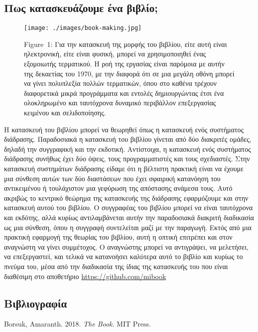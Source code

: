 \documentclass[
]{article}
\newlength{\cslhangindent}
\newlength{\cslentryspacingunit} %
\newenvironment{CSLReferences}[2] %
 {%
  \setlength{\parindent}{0pt}
  \ifodd #1
  \let\oldpar\par
  \def\par{\hangindent=\cslhangindent\oldpar}
  \fi
  \setlength{\parskip}{#2\cslentryspacingunit}
 }%
 {}
\begin{document}
\hypertarget{ux3c0ux3c9ux3c2-ux3baux3b1ux3c4ux3b1ux3c3ux3baux3b5ux3c5ux3acux3b6ux3bfux3c5ux3bcux3b5-ux3adux3bdux3b1-ux3b2ux3b9ux3b2ux3bbux3afux3bf}{%
\subsection{Πως κατασκευάζουμε ένα
βιβλίο;}\label{ux3c0ux3c9ux3c2-ux3baux3b1ux3c4ux3b1ux3c3ux3baux3b5ux3c5ux3acux3b6ux3bfux3c5ux3bcux3b5-ux3adux3bdux3b1-ux3b2ux3b9ux3b2ux3bbux3afux3bf}}

\leavevmode{}%
\begin{figure}
\hypertarget{fig:book-making}{%
\centering
\texttt{[image: ./images/book-making.jpg]}
\caption{Figure~1: Για την κατασκευή της μορφής του βιβλίου, είτε αυτή
είναι ηλεκτρονική, είτε είναι φυσική, μπορεί να χρησιμοποιηθεί ένας
εξομοιωτής τερματικού. Η ροή της εργασίας είναι παρόμοια με αυτήν της
δεκαετίας του 1970, με την διαφορά ότι σε μια μεγάλη οθόνη μπορεί να
γίνει πολυπλεξία πολλών τερματικών, όπου στο καθένα τρέχουν διαφορετικά
μικρά προγράμματα και εντολές δημιουργώντας έτσι ένα ολοκληρωμένο και
ταυτόχρονα δυναμικό περιβάλλον επεξεργασίας κειμένου και
σελιδοποίησης.}\label{fig:book-making}
}
\end{figure}

Η κατασκευή του βιβλίου μπορεί να θεωρηθεί όπως η κατασκευή ενός
συστήματος διάδρασης. Παραδοσιακά η κατασκευή του βιβλίου γίνεται από
δύο διακριτές ομάδες, δηλαδή την συγγραφική και την εκδοτική.
Αντίστοιχα, η κατασκευή ενός συστήματος διάδρασης συνήθως έχει δύο
όψεις, τους προγραμματιστές και τους σχεδιαστές. Στην κατασκευή
συστημάτων διάδρασης είδαμε ότι η βέλτιστη πρακτική είναι να έχουμε μια
σύνθεση αυτών των δύο διαστάσεων που έχει σφαιρική κατανόηση του
αντικειμένου ή τουλάχιστον μια γεφύρωση της απόστασης ανάμεσα τους. Αυτό
ακριβώς το κεντρικό θεώρημα της κατασκευής της διάδρασης εφαρμόζουμε και
στην κατασκευή αυτού του βιβλίου. Ο συγγραφέας του βιβλίου μπορεί να
είναι ταυτόχρονα και εκδότης, αλλά κυρίως αντιλαμβάνεται αυτήν την
παραδοσιακά διακριτή διαδικασία ως μια σύνθεση, όπου η συγγραφή
συντελείται μαζί με την παραγωγή. Εκτός από μια πρακτική εφαρμογή της
θεωρίας του βιβλίου, αυτή η οπτική επιτρέπει και στον αναγνώστη να γίνει
συμμέτοχος. Ο αναγνώστης μπορεί να αντιγράψει, να μελετήσει, να
επεξεργαστεί, και τελικά να κατανοήσει καλύτερα αυτό το βιβλίο και
κυρίως το πνεύμα του, μέσα από την διαδικασία της ίδιας της κατασκευής
του που είναι διαθέσιμη στο αποθετήριο \url{https://github.com/mibook}

\hypertarget{ux3b2ux3b9ux3b2ux3bbux3b9ux3bfux3b3ux3c1ux3b1ux3c6ux3afux3b1}{%
\subsection*{Βιβλιογραφία}\label{ux3b2ux3b9ux3b2ux3bbux3b9ux3bfux3b3ux3c1ux3b1ux3c6ux3afux3b1}}

\hypertarget{refs}{}
\begin{CSLReferences}{0}{0}
\end{CSLReferences}

Borsuk, Amaranth. 2018. \emph{The Book}. MIT Press.
\end{document}
